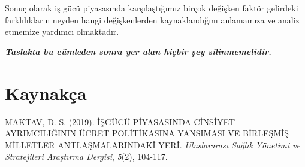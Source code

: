 \documentclass[
  12pt,
]{article}
\newlength{\cslhangindent}
\newlength{\cslentryspacingunit} %
\newenvironment{CSLReferences}[2] %
 {%
  \setlength{\parindent}{0pt}
  \ifodd #1
  \let\oldpar\par
  \def\par{\hangindent=\cslhangindent\oldpar}
  \fi
  \setlength{\parskip}{#2\cslentryspacingunit}
 }%
 {}
\begin{document}
Sonuç olarak iş gücü piyasasında karşılaştığımız birçok değişken faktör gelirdeki farklılıkların neyden hangi değişkenlerden kaynaklandığını anlamamıza ve analiz etmemize yardımcı olmaktadır.

\textbf{\emph{Taslakta bu cümleden sonra yer alan hiçbir şey silinmemelidir.}}

\newpage

\hypertarget{references}{%
\section{Kaynakça}\label{references}}

\hypertarget{refs}{}
\begin{CSLReferences}{1}{0}
\leavevmode{}%
MAKTAV, D. S. (2019). {İ}{Ş}G{Ü}C{Ü} P{İ}YASASINDA C{İ}NS{İ}YET AYRIMCILI{Ğ}ININ {Ü}CRET POL{İ}T{İ}KASINA YANSIMASI VE B{İ}RLE{Ş}M{İ}{Ş} M{İ}LLETLER ANTLA{Ş}MALARINDAK{İ} YER{İ}. \emph{Uluslararas{ı} Sa{ğ}l{ı}k Y{ö}netimi ve Stratejileri Ara{ş}t{ı}rma Dergisi}, \emph{5}(2), 104-117.

\end{CSLReferences}
\end{document}
